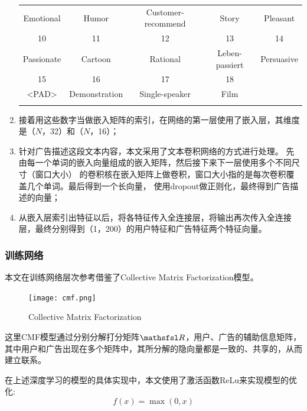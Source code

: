 \begin{enumerate}[(1)]
\begin{table}[H]
\begin{tabular}{ccccc}
        \hline
        Emotional                    & Humor            & Customer-recommend & Story          & Pleasant      \\
        \Xhline{1.2pt}
        10                           & 11               & 12                 & 13             & 14            \\
        \hline
        Passionate                   & Cartoon          & Rational           & Leben-passiert & Persuasive    \\
        \Xhline{1.2pt}
        15                           & 16               & 17                 & 18             &               \\
        \hline
        \textless{}PAD\textgreater{} & Demonstration    & Single-speaker     & Film           &              \\
        \Xhline{1.2pt}
        \end{tabular}
    \end{table}
    \item 接着用这些数字当做嵌入矩阵的索引，在网络的第一层使用了嵌入层，其维度是（$N$，32）和（$N$，16）；
    \item 针对广告描述这段文本内容，本文采用了文本卷积网络的方式进行处理。
    先由每一个单词的嵌入向量组成的嵌入矩阵，然后接下来下一层使用多个不同尺寸（窗口大小）
    的卷积核在嵌入矩阵上做卷积，窗口大小指的是每次卷积覆盖几个单词。最后得到一个长向量，
    使用dropout做正则化，最终得到广告描述的向量；
    \item 从嵌入层索引出特征以后，将各特征传入全连接层，将输出再次传入全连接层，最终分别得到（1，200）的用户特征和广告特征两个特征向量。
\end{enumerate}

\subsubsection{训练网络}

本文在训练网络层次参考借鉴了Collective Matrix Factorization模型\citep{Singh}。

\begin{figure}[H]
    \centering
    \texttt{[image: cmf.png]}
    \caption{Collective Matrix Factorization}
\end{figure}

这里CMF模型通过分别分解打分矩阵$\matr{R}$，用户、广告的辅助信息矩阵，
其中用户和广告出现在多个矩阵中，其所分解的隐向量都是一致的、共享的，从而建立联系。

在上述深度学习的模型的具体实现中，本文使用了激活函数ReLu来实现模型的优化:
\begin{equation}
    f(x)=\max(0,x)
\end{equation}

